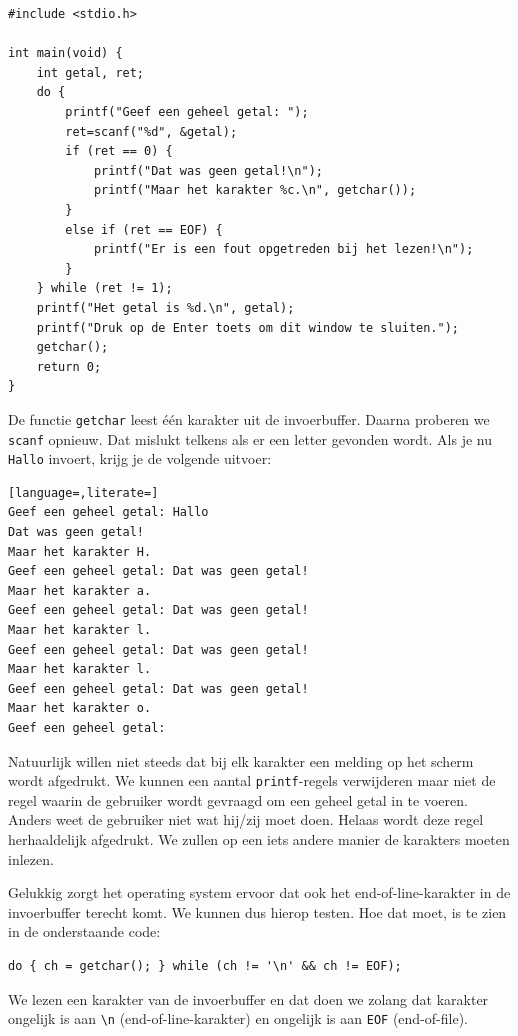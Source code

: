 \documentclass[a4paper,10pt,fleqn,twoside]{article}
\begin{document}
\begin{lstlisting}
#include <stdio.h>

int main(void) {
    int getal, ret;
    do {
        printf("Geef een geheel getal: ");
        ret=scanf("%d", &getal);
        if (ret == 0) {
            printf("Dat was geen getal!\n");
            printf("Maar het karakter %c.\n", getchar());
        }
        else if (ret == EOF) {
            printf("Er is een fout opgetreden bij het lezen!\n");
        }
    } while (ret != 1);
    printf("Het getal is %d.\n", getal);
    printf("Druk op de Enter toets om dit window te sluiten.");
    getchar();
    return 0;
}

\end{lstlisting}

De functie \lstinline|getchar| leest \'e\'en karakter uit de invoerbuffer. Daarna proberen we \lstinline|scanf| opnieuw. Dat mislukt telkens als er een letter gevonden wordt. Als je nu \lstinline|Hallo| invoert, krijg je de volgende uitvoer:

\begin{lstlisting}[language=,literate=]
Geef een geheel getal: Hallo
Dat was geen getal!
Maar het karakter H.
Geef een geheel getal: Dat was geen getal!
Maar het karakter a.
Geef een geheel getal: Dat was geen getal!
Maar het karakter l.
Geef een geheel getal: Dat was geen getal!
Maar het karakter l.
Geef een geheel getal: Dat was geen getal!
Maar het karakter o.
Geef een geheel getal:
\end{lstlisting}

Natuurlijk willen niet steeds dat bij elk karakter een melding op het scherm wordt afgedrukt. We kunnen een aantal \lstinline|printf|-regels verwijderen maar niet de regel waarin de gebruiker wordt gevraagd om een geheel getal in te voeren. Anders weet de gebruiker niet wat hij/zij moet doen. Helaas wordt deze regel herhaaldelijk afgedrukt. We zullen op een iets andere manier de karakters moeten inlezen.

Gelukkig zorgt het operating system ervoor dat ook het end-of-line-karakter in de invoerbuffer terecht komt. We kunnen dus hierop testen. Hoe dat moet, is te zien in de onderstaande code:

\begin{lstlisting}
do { ch = getchar(); } while (ch != '\n' && ch != EOF);
\end{lstlisting}

We lezen een karakter van de invoerbuffer en dat doen we zolang dat karakter ongelijk is aan \lstinline|\n| (end-of-line-karakter) en ongelijk is aan \lstinline|EOF| (end-of-file).
\end{document}
